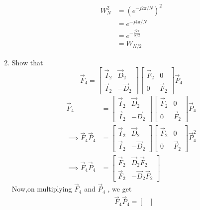 \documentclass[journal,12pt,twocolumn]{IEEEtran}
\renewcommand\thesection{\arabic{section}}
\begin{document}
\begin{enumerate}[label=\arabic*.,ref=\thesection.\theenumi]
\solution 
\begin{align}
	W_N^2&=\left(e^{-j2\pi/N}\right)^2\\
	&=e^{-j4\pi/N}\\
	&=e^{-\frac{j2\pi}{N/2}}\\
	&=W_{N/2}
\end{align}
	\item Show that 
	\begin{equation}
		\vec{F}_{4}=
		\begin{bmatrix}
			\vec{I}_{2} & \vec{D}_{2} \\
			\vec{I}_{2} & -\vec{D}_{2}
		\end{bmatrix}
		\begin{bmatrix}
			\vec{F}_{2} & 0 \\
			0 & \vec{F}_{2}
		\end{bmatrix}
		\vec{P}_{4}
	\end{equation}
\solution 
\begin{align}
	\vec{F}_{4}&=
	\begin{bmatrix}
		\vec{I}_{2} & \vec{D}_{2} \\
		\vec{I}_{2} & -\vec{D}_{2}
	\end{bmatrix}
	\begin{bmatrix}
		\vec{F}_{2} & 0 \\
		0 & \vec{F}_{2}
	\end{bmatrix}
	\vec{P}_{4}\\
	\implies \vec{F}_4\vec{P}_4&=\begin{bmatrix}
		\vec{I}_{2} & \vec{D}_{2} \\
		\vec{I}_{2} & -\vec{D}_{2}
	\end{bmatrix}
	\begin{bmatrix}
		\vec{F}_{2} & 0 \\
		0 & \vec{F}_{2}
	\end{bmatrix}
	\vec{P}_{4}^2\\
	\implies \vec{F}_4\vec{P}_4&=\begin{bmatrix}
		\vec{F}_{2} & \vec{D}_{2}\vec{F}_{2} \\
		\vec{F}_{2} & -\vec{D}_{2}\vec{F}_{2}
	\end{bmatrix}
\end{align}
Now,on multiplying $\vec{F}_4$ and $\vec{P}_4$ , we get
\begin{align}
	&\vec{F}_4\vec{P}_4 =\begin{bmatrix}

\end{bmatrix}
\end{align}
\end{enumerate}
\end{document}
